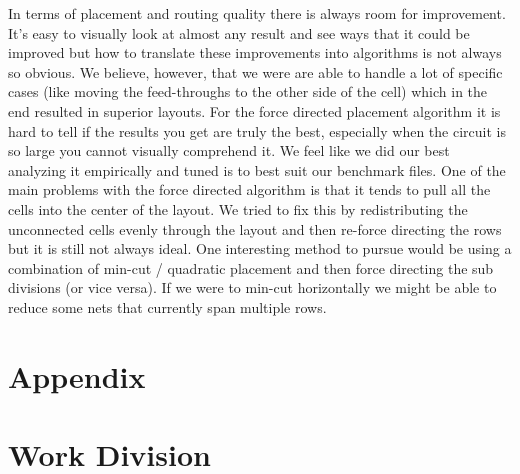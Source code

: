 \documentclass[10pt]{article}
\begin{document}
In terms of placement and routing quality there is always room for improvement.
It's easy to visually look at almost any result and see ways that it could be
improved but how to translate these improvements into algorithms is not always
so obvious. We believe, however, that we were are able to handle a lot of
specific cases (like moving the feed-throughs to the other side of the cell)
which in the end resulted in superior layouts.  For the force directed
placement algorithm it is hard to tell if the results you get are truly the
best, especially when the circuit is so large you cannot visually comprehend
it. We feel like we did our best analyzing it empirically and tuned is to best
suit our benchmark files. One of the main problems with the force directed
algorithm is that it tends to pull all the cells into the center of the layout.
We tried to fix this by redistributing the unconnected cells evenly through the
layout and then re-force directing the rows but it is still not always ideal.
One interesting method to pursue would be using a combination of min-cut /
quadratic placement and then force directing the sub divisions (or vice versa).
If we were to min-cut horizontally we might be able to reduce some nets that
currently span multiple rows.


\newpage
\section{Appendix}

\section{Work Division}
\end{document}
